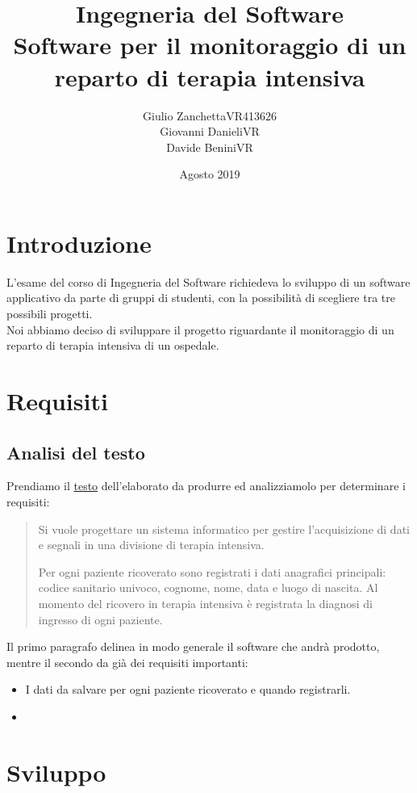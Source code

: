 \documentclass[a4paper]{report}
\title{Ingegneria del Software \\ Software  per il monitoraggio di un reparto di terapia intensiva}
\author{Giulio Zanchetta\hspace{0.2cm}VR413626 \\  Giovanni Danieli\hspace{0.2cm}VR \\  Davide Benini\hspace{0.2cm}VR}
\date{Agosto 2019}
\begin{document}
\maketitle
\tableofcontents

\chapter*{Introduzione}
    L'esame del corso di Ingegneria del Software richiedeva lo sviluppo di un software applicativo da parte di gruppi di studenti, con la possibilità di scegliere tra tre possibili progetti.\\
    Noi abbiamo deciso di sviluppare il progetto riguardante il monitoraggio di un reparto di terapia intensiva di un ospedale.
    
\chapter{Requisiti}
    \section{Analisi del testo}
        
        Prendiamo il \href{run:TerapiaIntensiva.pdf}{testo} dell'elaborato da produrre ed analizziamolo per determinare i requisiti:
        \begin{quote}
            Si vuole progettare un sistema informatico per gestire l’acquisizione di dati e segnali in una divisione di terapia intensiva.  
 
            Per ogni paziente ricoverato sono registrati i dati anagrafici principali: codice sanitario univoco, cognome, nome, data e luogo di nascita. Al momento del ricovero in terapia intensiva è registrata la diagnosi di ingresso di ogni paziente.
        \end{quote}
        Il primo paragrafo delinea in modo generale il software che andrà prodotto, mentre il secondo da già dei requisiti importanti:\\
        \begin{itemize}
            \item I dati da salvare per ogni paziente ricoverato e quando registrarli.
            \item 
        \end{itemize}
        

\chapter{Sviluppo}
\end{document}

